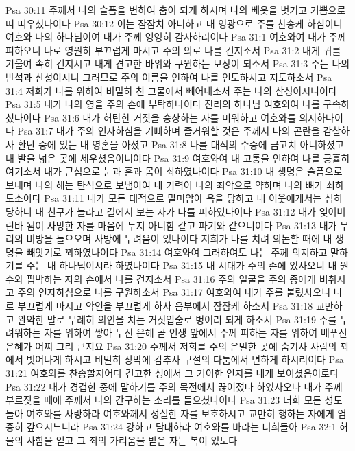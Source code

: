 Psa 30:11  주께서 나의 슬픔을 변하여 춤이 되게 하시며 나의 베옷을 벗기고 기쁨으로 띠 띠우셨나이다
Psa 30:12  이는 잠잠치 아니하고 내 영광으로 주를 찬송케 하심이니 여호와 나의 하나님이여 내가 주께 영영히 감사하리이다
Psa 31:1  여호와여 내가 주께 피하오니 나로 영원히 부끄럽게 마시고 주의 의로 나를 건지소서
Psa 31:2  내게 귀를 기울여 속히 건지시고 내게 견고한 바위와 구원하는 보장이 되소서
Psa 31:3  주는 나의 반석과 산성이시니 그러므로 주의 이름을 인하여 나를 인도하시고 지도하소서
Psa 31:4  저희가 나를 위하여 비밀히 친 그물에서 빼어내소서 주는 나의 산성이시니이다
Psa 31:5  내가 나의 영을 주의 손에 부탁하나이다 진리의 하나님 여호와여 나를 구속하셨나이다
Psa 31:6  내가 허탄한 거짓을 숭상하는 자를 미워하고 여호와를 의지하나이다
Psa 31:7  내가 주의 인자하심을 기뻐하며 즐거워할 것은 주께서 나의 곤란을 감찰하사 환난 중에 있는 내 영혼을 아셨고
Psa 31:8  나를 대적의 수중에 금고치 아니하셨고 내 발을 넓은 곳에 세우셨음이니이다
Psa 31:9  여호와여 내 고통을 인하여 나를 긍휼히 여기소서 내가 근심으로 눈과 혼과 몸이 쇠하였나이다
Psa 31:10  내 생명은 슬픔으로 보내며 나의 해는 탄식으로 보냄이여 내 기력이 나의 죄악으로 약하며 나의 뼈가 쇠하도소이다
Psa 31:11  내가 모든 대적으로 말미암아 욕을 당하고 내 이웃에게서는 심히 당하니 내 친구가 놀라고 길에서 보는 자가 나를 피하였나이다
Psa 31:12  내가 잊어버린바 됨이 사망한 자를 마음에 두지 아니함 같고 파기와 같으니이다
Psa 31:13  내가 무리의 비방을 들으오며 사방에 두려움이 있나이다 저희가 나를 치려 의논할 때에 내 생명을 빼앗기로 꾀하였나이다
Psa 31:14  여호와여 그러하여도 나는 주께 의지하고 말하기를 주는 내 하나님이시라 하였나이다
Psa 31:15  내 시대가 주의 손에 있사오니 내 원수와 핍박하는 자의 손에서 나를 건지소서
Psa 31:16  주의 얼굴을 주의 종에게 비취시고 주의 인자하심으로 나를 구원하소서
Psa 31:17  여호와여 내가 주를 불렀사오니 나로 부끄럽게 마시고 악인을 부끄럽게 하사 음부에서 잠잠케 하소서
Psa 31:18  교만하고 완악한 말로 무례히 의인을 치는 거짓입술로 벙어리 되게 하소서
Psa 31:19  주를 두려워하는 자를 위하여 쌓아 두신 은혜 곧 인생 앞에서 주께 피하는 자를 위하여 베푸신 은혜가 어찌 그리 큰지요
Psa 31:20  주께서 저희를 주의 은밀한 곳에 숨기사 사람의 꾀에서 벗어나게 하시고 비밀히 장막에 감추사 구설의 다툼에서 면하게 하시리이다
Psa 31:21  여호와를 찬송할지어다 견고한 성에서 그 기이한 인자를 내게 보이셨음이로다
Psa 31:22  내가 경겁한 중에 말하기를 주의 목전에서 끊어졌다 하였사오나 내가 주께 부르짖을 때에 주께서 나의 간구하는 소리를 들으셨나이다
Psa 31:23  너희 모든 성도들아 여호와를 사랑하라 여호와께서 성실한 자를 보호하시고 교만히 행하는 자에게 엄중히 갚으시느니라
Psa 31:24  강하고 담대하라 여호와를 바라는 너희들아
Psa 32:1  허물의 사함을 얻고 그 죄의 가리움을 받은 자는 복이 있도다
